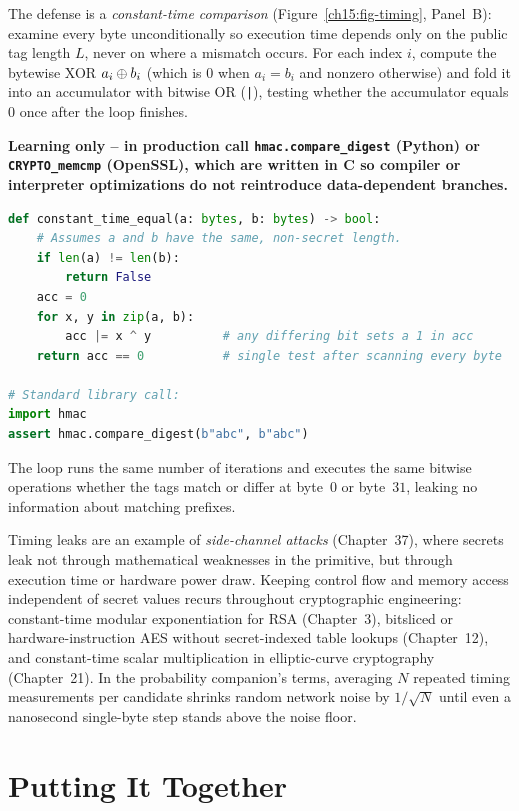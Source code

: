 The defense is a \emph{constant-time comparison} (Figure~\ref{ch15:fig-timing}, Panel~B): examine every byte unconditionally so execution time depends only on the public tag length $L$, never on where a mismatch occurs. For each index $i$, compute the bytewise XOR $a_i \oplus b_i$ (which is $0$ when $a_i = b_i$ and nonzero otherwise) and fold it into an accumulator with bitwise OR (\texttt{|}), testing whether the accumulator equals $0$ once after the loop finishes.

\begin{implementbox}
\textbf{Learning only -- in production call \texttt{hmac.compare\_digest} (Python) or \texttt{CRYPTO\_memcmp} (OpenSSL), which are written in C so compiler or interpreter optimizations do not reintroduce data-dependent branches.}
\begin{lstlisting}[language=Python]
def constant_time_equal(a: bytes, b: bytes) -> bool:
    # Assumes a and b have the same, non-secret length.
    if len(a) != len(b):
        return False
    acc = 0
    for x, y in zip(a, b):
        acc |= x ^ y          # any differing bit sets a 1 in acc
    return acc == 0           # single test after scanning every byte

# Standard library call:
import hmac
assert hmac.compare_digest(b"abc", b"abc")
\end{lstlisting}
The loop runs the same number of iterations and executes the same bitwise operations whether the tags match or differ at byte~$0$ or byte~$31$, leaking no information about matching prefixes.
\end{implementbox}

\begin{connectionbox}
Timing leaks are an example of \emph{side-channel attacks} (Chapter~37), where secrets leak not through mathematical weaknesses in the primitive, but through execution time or hardware power draw. Keeping control flow and memory access independent of secret values recurs throughout cryptographic engineering: constant-time modular exponentiation for RSA (Chapter~3), bitsliced or hardware-instruction AES without secret-indexed table lookups (Chapter~12), and constant-time scalar multiplication in elliptic-curve cryptography (Chapter~21). In the probability companion's terms, averaging $N$ repeated timing measurements per candidate shrinks random network noise by $1/\sqrt{N}$ until even a nanosecond single-byte step stands above the noise floor.
\end{connectionbox}

\section{Putting It Together}
\label{ch15:summary}

